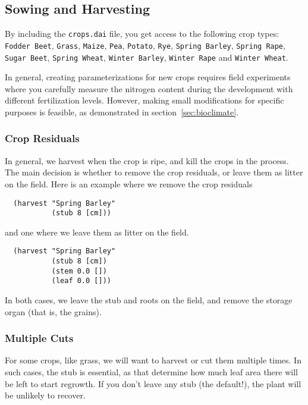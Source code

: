 \documentclass[a4paper]{article}
\begin{document}
\subsection{Sowing and Harvesting}
\label{sec:sow}

By including the \texttt{crops.dai} file, you get access to the
following crop types: \texttt{Fodder Beet}, \texttt{Grass},
\texttt{Maize}, \texttt{Pea}, \texttt{Potato}, \texttt{Rye},
\texttt{Spring Barley}, \texttt{Spring Rape}, \texttt{Sugar Beet},
\texttt{Spring Wheat}, \texttt{Winter Barley}, \texttt{Winter Rape}
and \texttt{Winter Wheat}.

In general, creating parameterizations for new crops requires field
experiments where you carefully measure the nitrogen content during
the development with different fertilization levels.  However, making
small modifications for specific purposes is feasible, as
demonstrated in section~\ref{sec:bioclimate}.

\subsubsection{Crop Residuals}

In general, we harvest when the crop is ripe, and kill the crops in
the process. The main decision is whether to remove the crop
residuals, or leave them as litter on the field.  Here is an example
where we remove the crop residuals
\begin{verbatim}
  (harvest "Spring Barley"
           (stub 8 [cm]))
\end{verbatim}
and one where we leave them as litter on the field.
\begin{verbatim}
  (harvest "Spring Barley"
           (stub 8 [cm])
           (stem 0.0 [])
           (leaf 0.0 []))
\end{verbatim}
In both cases, we leave the stub and roots on the field, and remove
the storage organ (that is, the grains).

\subsubsection{Multiple Cuts}
\label{sec:cuts}

For some crops, like grass, we will want to harvest or cut them
multiple times.  In such cases, the stub is essential, as that
determine how much leaf area there will be left to start regrowth.  If
you don't leave any stub (the default!), the plant will be unlikely to
recover.
\end{document}
